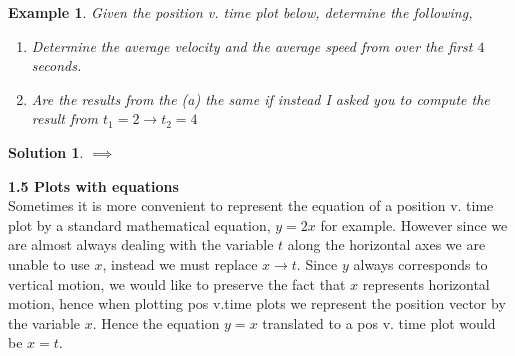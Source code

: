 \documentclass[12pt]{article}
\theoremstyle{break}
\newtheorem{ex}[thm]{Example}
\newtheorem*{soln}{Solution}
\begin{document}
\let\ref\Cref
\begin{ex}
    Given the position v. time plot below, determine the following,

    \begin{enumerate} [label = (\alph*)]
        \item Determine the average velocity and the average speed from over the first $4$ seconds.
        \item Are the results from the (a) the same if instead I asked you to compute the result from $t_1 = 2 \rightarrow t_2 = 4$
    \end{enumerate}

    \begin{center}
    \end{center}

\end{ex}

\begin{soln}
$\implies$
\vspace*{7cm}

\end{soln}
\textbf{\large{1.5 \hspace*{0.2cm} Plots with equations}}\\
Sometimes it is more convenient to represent the equation of a position v. time plot by a standard mathematical equation, $y = 2x$ for example. However since we are almost always dealing with the variable $t$ along the horizontal axes we are unable to use $x$, instead we must replace $x \rightarrow t$. Since $y$ always corresponds to vertical motion, we would like to preserve the fact that $x$ represents horizontal motion, hence when plotting pos v.time plots we represent the position vector by the variable $x$. Hence the equation $y = x$ translated to a pos v. time plot would be $x = t$. 
\end{document}
